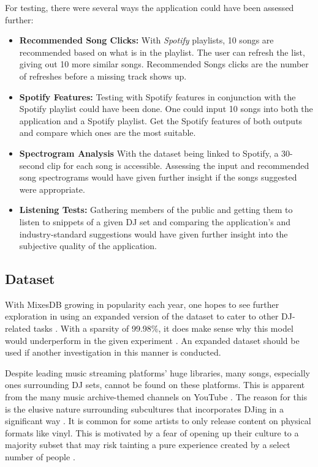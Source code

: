 For testing, there were several ways the application could have been assessed further:
\begin{itemize}
	
	\item \textbf{Recommended Song Clicks:} With \textit{Spotify} playlists, 10 songs are recommended based on what is in the playlist. The user can refresh the list, giving out 10 more similar songs. Recommended Songs clicks are the number of refreshes before a missing track shows up.
	
	\item \textbf{Spotify Features:} Testing with Spotify features in conjunction with the Spotify playlist could have been done. One could input 10 songs into both the application and a Spotify playlist. Get the Spotify features of both outputs and compare which ones are the most suitable.
	
	\item \textbf{Spectrogram Analysis} With the dataset being linked to Spotify, a 30-second clip for each song is accessible. Assessing the input and recommended song spectrograms would have given further insight if the songs suggested were appropriate.
	
	\item \textbf{Listening Tests:} Gathering members of the public and getting them to listen to snippets of a given DJ set and comparing the application's and industry-standard suggestions would have given further insight into the subjective quality of the application.
\end{itemize}

\subsection{Dataset}
With MixesDB growing in popularity each year, one hopes to see further exploration in using an expanded version of the dataset to cater to other DJ-related tasks \citep{similarweb_mixesdbcom_2023}. With a sparsity of 99.98\%, it does make sense why this model would underperform in the given experiment \citep{zhang2020alleviating}. An expanded dataset should be used if another investigation in this manner is conducted. 

Despite leading music streaming platforms' huge libraries, many songs, especially ones surrounding DJ sets, cannot be found on these platforms. This is apparent from the many music archive-themed channels on YouTube \citep{allen_djs_2021}. The reason for this is the elusive nature surrounding subcultures that incorporates DJing in a significant way \citep{reynolds_energy_2013}. It is common for some artists to only release content on physical formats like vinyl. This is motivated by a fear of opening up their culture to a majority subset that may risk tainting a pure experience created by a select number of people \citep{wheeler_gentrification_2020}. 

